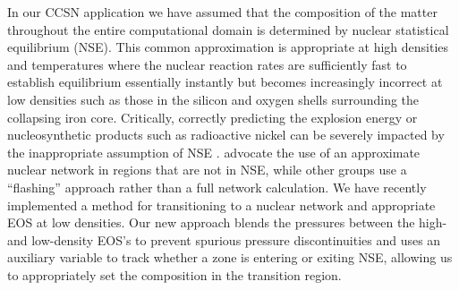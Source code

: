 \documentclass[12pt]{article}
\begin{document}
In our \flash CCSN application we have assumed that the composition of the matter throughout the entire computational domain is determined by nuclear statistical equilibrium (NSE).
This common approximation \citep[e.g.,][]{Burrows:2007, Ott:2008, Dolence:2015, Skinner:2016, Roberts:2016, Kuroda:2016} is appropriate at high densities and temperatures where the nuclear reaction rates are sufficiently fast to establish equilibrium essentially instantly but becomes increasingly incorrect at low densities such as those in the silicon and oxygen shells surrounding the collapsing iron core.
Critically, correctly predicting the explosion energy or nucleosynthetic products such as radioactive nickel can be severely impacted by the inappropriate assumption of NSE \citep{bruenn:2016}.
\citet{bruenn:2016} advocate the use of an approximate nuclear network in regions that are not in NSE, while other groups \citep[e.g.,][]{muller:2012a, Melson:2015} use a ``flashing'' approach rather than a full network calculation.
We have recently implemented a method for transitioning to a nuclear network and appropriate EOS at low densities.
Our new approach blends the pressures between the high- and low-density EOS's to prevent spurious pressure discontinuities and uses an auxiliary variable to track whether a zone is entering or exiting NSE, allowing us to appropriately set the composition in the transition region.
\end{document}
